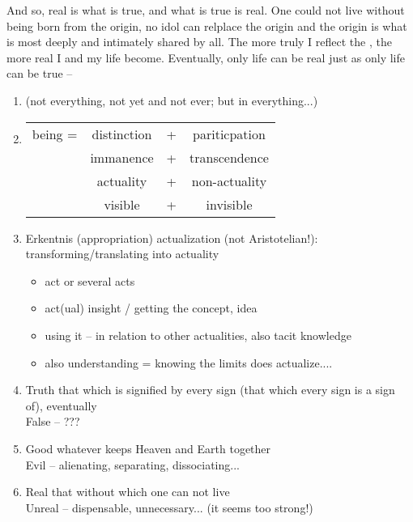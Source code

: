 And so, real is what is true, and what is true is real. One could 
not live without being born from the origin, no idol can relplace the 
origin and the origin is what is most deeply and intimately shared by 
all. The more 
truly I reflect the , the more real I and my life become. 
Eventually, only life can be real just as only life can be true -- 


\begin{enumerate}
\item {} \simu {} \simu {} (not everything, not yet and
  not ever; but in everything...)
\item \begin{tabular}[t]{lccc}
    being = & distinction & + & pariticpation  \\
            & immanence   & + & transcendence \\
            & actuality   & + & non-actuality\\
            & visible     & + & invisible
     \end{tabular}
\item Erkentnis (appropriation) \simu actualization (not Aristotelian!):
  transforming/translating into actuality
  \begin{itemize}
   \item act or several acts
    \item act(ual) insight / getting the concept, idea
   \item using it -- in relation to other actualities, also tacit knowledge
   \item also understanding = knowing the limits does actualize....
  \end{itemize}
\item Truth \simu that which is signified by every sign (that which
  every sign is a sign of), eventually 
  \\
  False -- ???
\item Good \simu whatever keeps Heaven and Earth together
  \\
  Evil -- alienating, separating, dissociating...
\item Real \simu that without which one can not live\\
  Unreal -- dispensable, unnecessary... (it seems too strong!)
\end{enumerate}  

